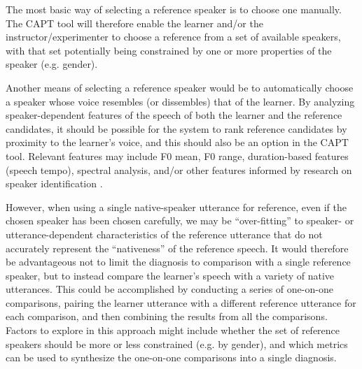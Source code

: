 		
		The most basic way of selecting a reference speaker is to choose one manually.
The CAPT tool will therefore enable  the learner and/or the instructor/experimenter to choose a reference from a set of available speakers, with that set potentially being constrained by one or more properties of the speaker (e.g. gender). 
	
		
		Another means of selecting a reference speaker would be to automatically choose a speaker whose voice resembles (or dissembles) that of the learner. By analyzing speaker-dependent features of the speech of both the learner and the reference candidates, it should be possible for the system to rank reference candidates by proximity to the learner's voice, and this should also be an option in the CAPT tool. Relevant features may include F0 mean, F0 range, duration-based features (speech tempo), spectral analysis, and/or other features informed by research on speaker identification \citep[etc.]{Shriberg2005,Reynolds1995}. 
	
	
	However, when using a single native-speaker utterance for reference, even if the chosen speaker has been chosen carefully, we may be ``over-fitting'' to speaker- or utterance-dependent characteristics of the reference utterance that do not accurately represent the ``nativeness'' of the reference speech. It would therefore be advantageous not to limit the diagnosis to comparison with a single reference speaker, but to instead compare the learner's speech with a variety of native utterances. This could be accomplished by conducting a series of one-on-one comparisons, pairing the learner utterance with a different reference utterance for each comparison, and then combining the results from all the comparisons.  Factors to explore in this approach might include whether the set of reference speakers should be more or less constrained (e.g. by gender), and which metrics can be used to synthesize the one-on-one comparisons into a single diagnosis.
	
